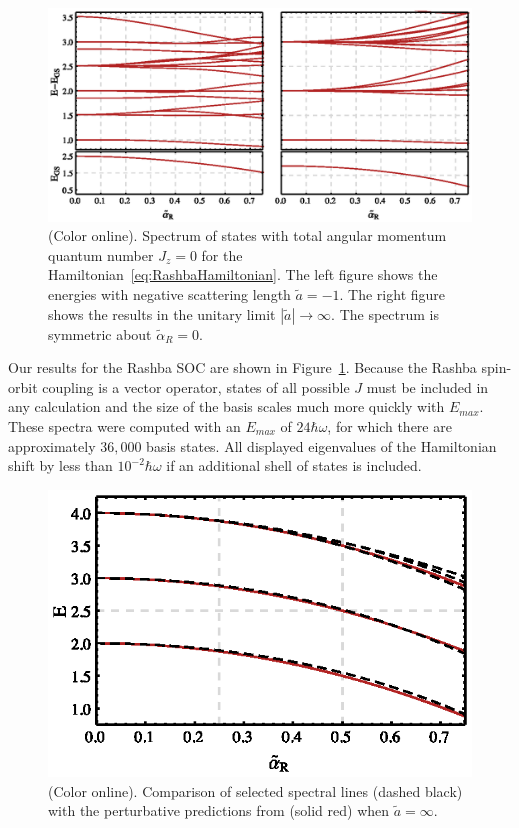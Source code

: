 \documentclass[%
 notitlepage,
 preprint,
showpacs,%
 amsmath,amssymb,
 aps,
pra,
]{revtex4-1}
\begin{document}
\begin{figure}
\includegraphics{Figures/RashbaSpectrum}
\caption{\label{fig:RashbaSpectrum}(Color online).  Spectrum of states with total angular momentum quantum number $J_z=0$ for the Hamiltonian~\eqref{eq:RashbaHamiltonian}. The left figure shows the energies with negative scattering length $\tilde{a}=-1$. The right figure shows the results in the unitary limit $|\tilde{a}|\rightarrow\infty$. The spectrum is symmetric about $\tilde{\alpha}_R=0$.} 
\end{figure}


Our results for the Rashba SOC are shown in Figure~\ref{fig:RashbaSpectrum}. Because the Rashba spin-orbit coupling is a vector operator, states of all possible $J$ must be included in any calculation and the size of the basis scales much more quickly with $E_{max}$. These spectra were computed with an $E_{max}$ of $24\hbar\omega$, for which there are approximately $36,000$ basis states. All displayed eigenvalues of the Hamiltonian shift by less than $10^{-2}\hbar\omega$ if an additional shell of states is included.

\begin{figure}
\includegraphics{Figures/PerturbativeComparison}
\caption{\label{fig:ComparisonSpectrum}(Color online).  Comparison of selected spectral lines (dashed black) with the perturbative predictions from \cite{PhysRevA.89.033606} (solid red) when $\tilde{a}=\infty$. }
\end{figure}
\end{document}
